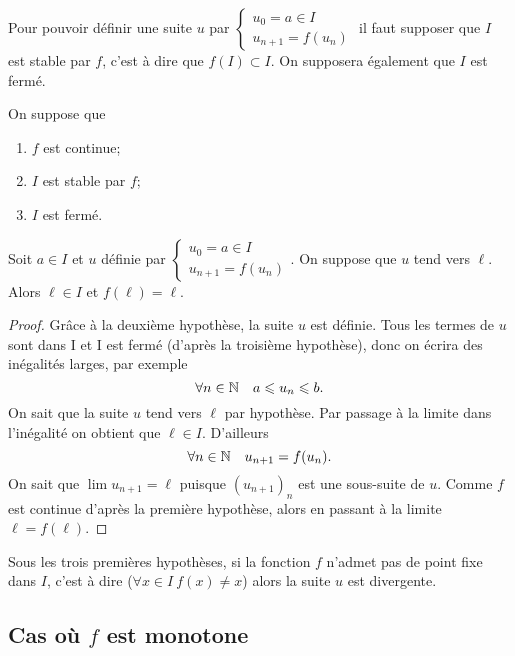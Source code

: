Pour pouvoir définir une suite \(u\) par \(\begin{cases} u_0=a \in I \\ u_{n+1}=f(u_n) \end{cases}\) il faut supposer que \(I\) est stable par \(f\), c'est à dire que \(f(I) \subset I\). On supposera également que \(I\) est fermé.

\begin{prop}
  On suppose que 
  \begin{enumerate}
  \item \(f\) est continue;
  \item \(I\) est stable par \(f\);
  \item \(I\) est fermé.
  \end{enumerate}
  Soit \(a \in I\) et \(u\) définie par \(\begin{cases} u_0=a \in I \\ u_{n+1}=f(u_n) \end{cases}\). On suppose que \(u\) tend vers \(\ell\). Alors \(\ell \in I\) et \(f(\ell)=\ell\).
\end{prop}
\begin{proof}
  Grâce à la deuxième hypothèse, la suite \(u\) est définie. Tous les termes de \(u\) sont dans I et I est fermé (d'après la troisième hypothèse), donc on écrira des inégalités larges, par exemple
  \begin{equation}
    \forall n \in \mathbb{N} \quad a \leqslant u_n \leqslant b.
  \end{equation}
  On sait que la suite \(u\) tend vers \(\ell\) par hypothèse. Par passage à la limite dans l'inégalité on obtient que \(\ell \in I\). D'ailleurs
  \begin{equation}
    \forall n \in \mathbb{N} \quad u_{n+1}=f(u_n).
  \end{equation}
  On sait que \(\lim u_{n+1}=\ell\) puisque \((u_{n+1})_n\) est une sous-suite de \(u\). Comme \(f\) est continue d'après la première hypothèse, alors en passant à la limite \(\ell=f(\ell)\).
\end{proof}

Sous les trois premières hypothèses, si la fonction \(f\) n'admet pas de point fixe dans \(I\), c'est à dire (\(\forall x \in I \ f(x) \neq x\)) alors la suite \(u\) est divergente.

\subsection{Cas où \(f\) est monotone}

